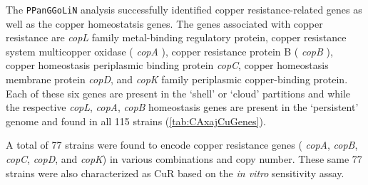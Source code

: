 \documentclass[
]{book}
\begin{document}
The \texttt{PPanGGoLiN} analysis successfully identified copper resistance-related genes as well as the copper homeostatsis genes. The genes associated with copper resistance are \emph{copL} family metal-binding regulatory protein, copper resistance system multicopper oxidase ( \emph{copA} ), copper resistance protein B ( \emph{copB} ), copper homeostasis periplasmic binding protein \emph{copC}, copper homeostasis membrane protein \emph{copD}, and \emph{copK} family periplasmic copper-binding protein. Each of these six genes are present in the `shell' or `cloud' partitions and while the respective \emph{copL}, \emph{copA}, \emph{copB} homeostasis genes are present in the `persistent' genome and found in all 115 strains (\ref{tab:CAxajCuGenes}).

A total of 77 strains were found to encode copper resistance genes ( \emph{copA}, \emph{copB}, \emph{copC}, \emph{copD}, and \emph{copK}) in various combinations and copy number. These same 77 strains were also characterized as CuR based on the \emph{in vitro} sensitivity assay.
\end{document}
